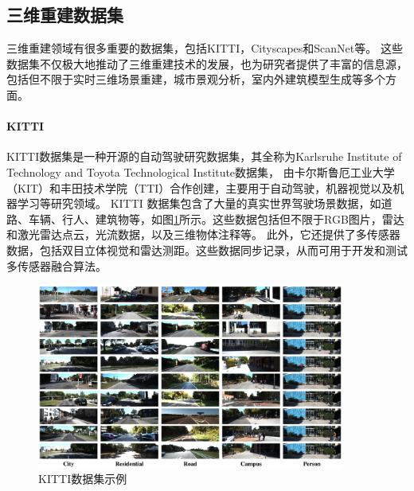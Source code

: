 

\subsection{三维重建数据集}
\par 三维重建领域有很多重要的数据集，包括KITTI\cite{kitti}，Cityscapes\cite{Cityscapes}和ScanNet\cite{scannet}等。
这些数据集不仅极大地推动了三维重建技术的发展，也为研究者提供了丰富的信息源，包括但不限于实时三维场景重建，城市景观分析，室内外建筑模型生成等多个方面。

\paragraph{KITTI}
KITTI数据集是一种开源的自动驾驶研究数据集，其全称为Karlsruhe Institute of Technology and Toyota
Technological Institute数据集，
由卡尔斯鲁厄工业大学（KIT）和丰田技术学院（TTI）合作创建，主要用于自动驾驶，机器视觉以及机器学习等研究领域。 KITTI
数据集包含了大量的真实世界驾驶场景数据，如道路、车辆、行人、建筑物等，如图\ref{fig:kitti_exp}\cite{kitti}所示。这些数据包括但不限于RGB图片，雷达和激光雷达点云，光流数据，以及三维物体注释等。
此外，它还提供了多传感器数据，包括双目立体视觉和雷达测距。这些数据同步记录，从而可用于开发和测试多传感器融合算法。

\begin{figure}[htb]
	\centering
	\includegraphics[width=0.9\textwidth]{figures/kitti_exp.png}
	\caption{KITTI数据集示例}
	\label{fig:kitti_exp}
\end{figure}

